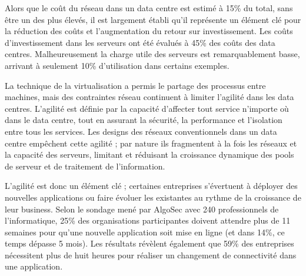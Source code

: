 \par
Alors que le coût du réseau dans un data centre est estimé à 15\% du total, sans être un des plus élevés, il est largement établi qu'il représente un élément clé pour la réduction des coûts et l'augmentation du retour sur investissement. Les coûts d'investissement dans les serveurs ont été évalués à 45\% des coûts des data centres. Malheureusement la charge utile des serveurs est remarquablement basse, arrivant à seulement 10\% d'utilisation dans certains exemples.  \cite{cloudCosts}

\par 
La technique de la virtualisation a permis le partage des processus entre machines, mais des contraintes réseau continuent à limiter l'agilité dans les data centres. L'agilité est définie par la capacité d'affecter tout service n'importe où dans le data centre, tout en assurant la sécurité, la performance et l'isolation entre tous les services. Les designs des réseaux conventionnels dans un data centre empêchent cette agilité ; par nature ils fragmentent  à la fois les réseaux et la capacité des serveurs, limitant et réduisant la croissance dynamique des pools de serveur et de traitement de l'information. \cite{cloudCostsAgility}



\par 
L'agilité est donc un élément clé ; certaines entreprises s'évertuent à déployer des nouvelles applications ou faire évoluer les existantes au rythme de la croissance de leur business. Selon le sondage mené par AlgoSec avec 240 professionnels de l'informatique, 25\% des organisations participantes doivent attendre plus de 11 semaines pour qu'une nouvelle application soit mise en ligne (et dans 14\%, ce temps dépasse 5 mois). Les résultats révèlent également que 59\% des entreprises nécessitent plus de huit heures pour réaliser un changement de connectivité dans une application. \cite{algoSecSurvey}



